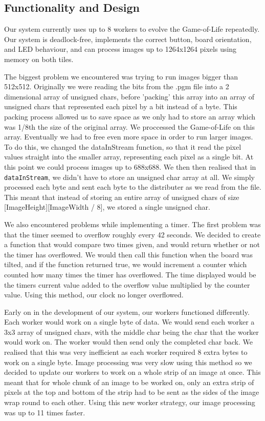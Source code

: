 \documentclass{article}
\begin{document}
\begin{multicols}{2}

\section{Functionality and Design}
Our system currently uses up to 8 workers to evolve the Game-of-Life repeatedly. Our system is 
deadlock-free, implements the correct button, board orientation, and LED behaviour, and can process 
images up to 1264x1264 pixels using memory on both tiles.

The biggest problem we encountered was trying to run images bigger than 512x512. Originally we were 
reading the bits from the .pgm file into a 2 dimensional array of unsigned chars, before 'packing' 
this array into an array of unsigned chars that represented each pixel by a bit instead of a byte. 
This packing process allowed us to save space as we only had to store an array which was 1/8th the 
size of the original array. We proccessed the Game-of-Life on this array. Eventually we had to 
free even more space in order to run larger images. To do this, we changed the dataInStream function, 
so that it read the pixel values straight into the smaller array, representing each pixel as a 
single bit. At this point we could process images up to 688x688. We then then realised that in
\texttt{dataInStream}, we didn't have to store an unsigned char array at all. We simply processed 
each byte and sent each byte to the distributer as we read from the file. This meant that instead 
of storing an entire array of unsigned chars of size [ImageHeight][ImageWidth / 8], we stored a single 
unsigned char.

We also encountered problems while implementing a timer. The first problem was that the timer seemed 
to overflow roughly every 42 seconds. We decided to create a function that would compare two times 
given, and would return whether or not the timer has overflowed. We would then call this function when 
the board was tilted, and if the function returned true, we would increment a counter which counted 
how many times the timer has overflowed. The time displayed would be the timers current value added 
to the overflow value multiplied by the counter value. Using this method, our clock no longer 
overflowed.

Early on in the development of our system, our workers functioned differently. Each worker would work
on a single byte of data. We would send each worker a 3x3 array of unsigned chars, with the middle 
char being the char that the worker would work on. The worker would then send only the completed
char back. We realised that this was very inefficient as each worker required 8 extra bytes to work
on a single byte. Image processing was very slow using this method so we decided to update
our workers to work on a whole strip of an image at once. This meant that for whole chunk of an image
to be worked on, only an extra strip of pixels at the top and bottom of the strip had to be sent as
the sides of the image wrap round to each other. Using this new worker strategy, our image processing
was up to 11 times faster.


\end{multicols}
\end{document}
